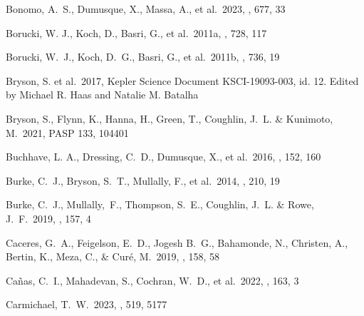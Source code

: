 \documentclass{aastex62}
\begin{document}
\begin{thebibliography}{}

Bonomo, A.~S., Dumusque, X., Massa, A., et al.~2023, \aap, 677, 33

Borucki, W. J., Koch, D., Basri, G., et al.~2011a,
\apj, 728, 117

Borucki, W.~J., Koch, D.~G., Basri, G., et al.~2011b,
\apj, 736, 19





 Bryson, S. et al.~2017, Kepler Science Document KSCI-19093-003, id. 12. Edited by Michael R. Haas and Natalie M. Batalha

 Bryson, S., Flynn, K.,  Hanna, H.,  Green, T.,  Coughlin, J.~L.  \&  Kunimoto, M.~2021, PASP 133, 104401

 Buchhave, L. A., Dressing, C.~D., Dumusque, X., et al.~2016, \aj, 152, 160

Burke, C.~J., Bryson, S.~T., Mullally, F., et al.~2014,  \apjs, 210, 19

Burke, C.~J., Mullally,~F., Thompson, S.~E., Coughlin, J.~L. \& Rowe, J.~F.~2019, \aj, 157, 4

 Caceres, G.~A., Feigelson, E.~D.,  Jogesh B.~G.,  Bahamonde, N.,  Christen, A., Bertin, K.,  Meza, C., \& Cur{\'e}, M.~2019, \aj, 158, 58

 Ca{\~n}as, C.~I., Mahadevan, S., Cochran, W.~D., et al.~2022, \aj, 163, 3

Carmichael, T.~W.~2023, \mnras, 519, 5177


\end{thebibliography}
\end{document}
